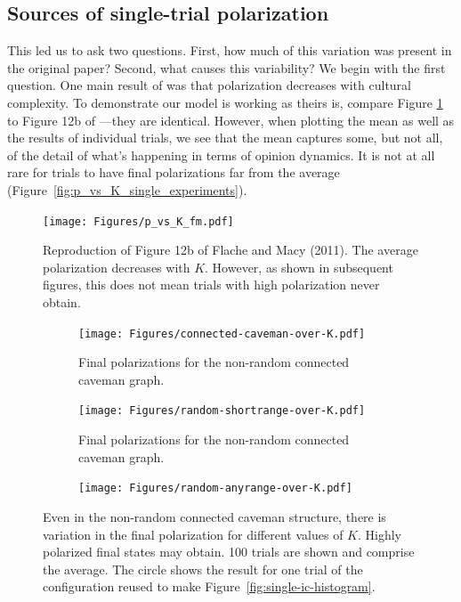 \documentclass[11pt,letterpaper]{article}
\begin{document}
\subsection{Sources of single-trial polarization}

This led us to ask two questions. First, how much of this variation was 
present in the original  paper? Second, what causes
this variability? We begin with the first question. One main result of
 was that polarization decreases with cultural complexity.
To demonstrate our model is working as theirs is, compare Figure 
\ref{fig:p_vs_K_fm} to Figure 12b of ---they are identical.
However, when plotting the mean as well as the results of individual trials,
we see that the mean captures some, but not all, of the detail of what's 
happening in terms of opinion dynamics. It is not at all rare for trials to
have final polarizations far from the average 
(Figure~\ref{fig:p_vs_K_single_experiments}). 

\begin{figure}
  \centering
    \texttt{[image: Figures/p\_vs\_K\_fm.pdf]}
  \caption{Reproduction of Figure 12b of Flache and Macy (2011). The average
    polarization decreases with $K$. However, as shown in subsequent figures,
    this does not mean trials with high polarization never obtain.
  }
  \label{fig:p_vs_K_fm}
\end{figure}


\begin{figure}[h!]
  \centering
    \begin{subfigure}[t]{\textwidth}
      \centering
      \texttt{[image: Figures/connected-caveman-over-K.pdf]}
      \caption{Final polarizations for the non-random connected caveman graph.}
      \label{fig:connected-caveman-trials}
    \end{subfigure}
    \begin{subfigure}[t]{\textwidth}
      \centering
      \texttt{[image: Figures/random-shortrange-over-K.pdf]}
      \caption{Final polarizations for the non-random connected caveman graph.}
      \label{fig:random-shortrange-trials}
    \end{subfigure}
    \begin{subfigure}[t]{\textwidth}
      \centering
      \texttt{[image: Figures/random-anyrange-over-K.pdf]}
      \caption{}
      \label{fig:random-anyrange-trials}
    \end{subfigure}
  \caption{Even in the non-random connected caveman structure, there is 
    variation in the final polarization for different values of $K$. Highly
    polarized final states may obtain. 100 trials are shown and comprise the
    average. The circle shows the result for one trial of the configuration
    reused to make Figure~\ref{fig:single-ic-histogram}.
  }
  \label{fig:single-experiments-over-k}
\end{figure}
\end{document}
